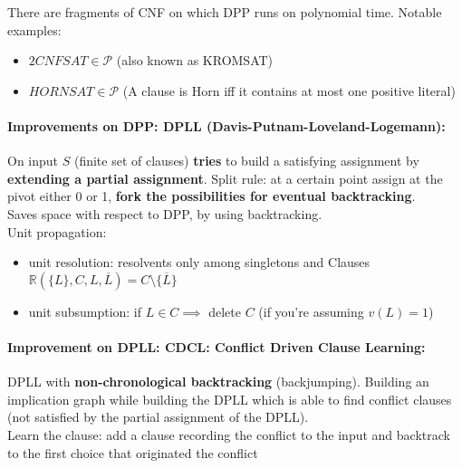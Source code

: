 There are fragments of CNF on which DPP runs on polynomial time. Notable examples: 
\begin{itemize}
	\item $2CNFSAT \in \mathcal{P}$ (also known as KROMSAT)
	\item $HORNSAT \in \mathcal{P}$ (A clause is Horn iff it contains at most one positive literal)
\end{itemize}

%
%
%

\paragraph{Improvements on DPP: DPLL (Davis-Putnam-Loveland-Logemann):} On input $S$ (finite set of clauses) \textbf{tries} to build a satisfying assignment by \textbf{extending a partial assignment}. Split rule: at a certain point assign at the pivot either 0 or 1, \textbf{fork the possibilities for eventual backtracking}.\\
Saves space with respect to DPP, by using backtracking.\\

Unit propagation: 
\begin{itemize}
	\item unit resolution: resolvents only among singletons and Clauses $\mathbb{R} (\{L\}, C, L, \overline L) = C \setminus \{\overline{L}\}$
	\item unit subsumption: if $L \in C \implies$ delete $C$ (if you're assuming $v(L) = 1$)
\end{itemize}

\paragraph{Improvement on DPLL: CDCL: Conflict Driven Clause Learning:} DPLL with \textbf{non-chronological backtracking} (backjumping). Building an implication graph while building the DPLL which is able to find conflict clauses (not satisfied by the partial assignment of the DPLL).\\

Learn the clause: add a clause recording the conflict to the input and backtrack to the first choice that originated the conflict



\newpage